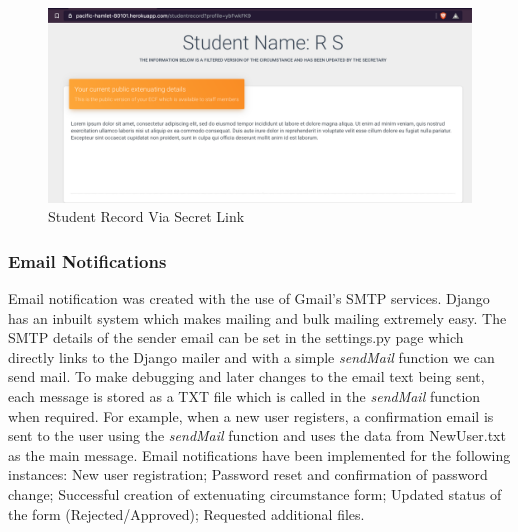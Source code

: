 \documentclass[../main.tex]{subfiles}
\begin{document}
\begin{figure}[H]
        \includegraphics[scale=0.7]
        {images/studrecord.png}
        \caption{\label{fig:studrecord} Student Record Via Secret Link}
      \end{figure}

\subsubsection{Email Notifications} 
Email notification was created with the use of Gmail's SMTP services. Django has an inbuilt system which makes mailing and bulk mailing extremely easy. The SMTP details of the sender email can be set in the settings.py page which directly links to the Django mailer and with a simple \textit{sendMail} function we can send mail. To make debugging and later changes to the email text being sent, each message is stored as a TXT file which is called in the \textit{sendMail} function when required. For example, when a new user registers, a confirmation email is sent to the user using the \textit{sendMail} function and uses the data from NewUser.txt as the main message. Email notifications have been implemented for the following instances: New user registration; Password reset and confirmation of password change; Successful creation of extenuating circumstance form; Updated status of the form (Rejected/Approved); Requested additional files.
\end{document}
